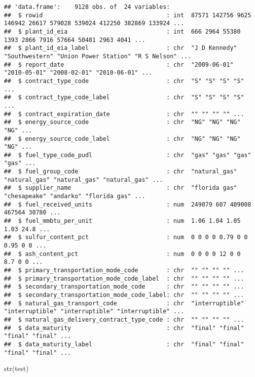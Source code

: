 \documentclass[
]{article}
\newenvironment{Shaded}{\begin{snugshade}}{\end{snugshade}}
\newcommand{\FunctionTok}[1]{\textcolor[rgb]{0.00,0.00,0.00}{#1}}
\newcommand{\NormalTok}[1]{#1}
\begin{document}
\begin{verbatim}
## 'data.frame':    9128 obs. of  24 variables:
##  $ rowid                                   : int  87571 142756 9625 146942 26617 579028 539024 412250 382869 133924 ...
##  $ plant_id_eia                            : int  666 2964 55380 1393 2866 7916 57664 50481 2963 4041 ...
##  $ plant_id_eia_label                      : chr  "J D Kennedy" "Southwestern" "Union Power Station" "R S Nelson" ...
##  $ report_date                             : chr  "2009-06-01" "2010-05-01" "2008-02-01" "2010-06-01" ...
##  $ contract_type_code                      : chr  "S" "S" "S" "S" ...
##  $ contract_type_code_label                : chr  "S" "S" "S" "S" ...
##  $ contract_expiration_date                : chr  "" "" "" "" ...
##  $ energy_source_code                      : chr  "NG" "NG" "NG" "NG" ...
##  $ energy_source_code_label                : chr  "NG" "NG" "NG" "NG" ...
##  $ fuel_type_code_pudl                     : chr  "gas" "gas" "gas" "gas" ...
##  $ fuel_group_code                         : chr  "natural_gas" "natural_gas" "natural_gas" "natural_gas" ...
##  $ supplier_name                           : chr  "florida gas" "chesapeake" "andarko" "florida gas" ...
##  $ fuel_received_units                     : num  249079 607 409008 467564 30780 ...
##  $ fuel_mmbtu_per_unit                     : num  1.06 1.04 1.05 1.03 24.8 ...
##  $ sulfur_content_pct                      : num  0 0 0 0 0.79 0 0 0.95 0 0 ...
##  $ ash_content_pct                         : num  0 0 0 0 12 0 0 8.7 0 0 ...
##  $ primary_transportation_mode_code        : chr  "" "" "" "" ...
##  $ primary_transportation_mode_code_label  : chr  "" "" "" "" ...
##  $ secondary_transportation_mode_code      : chr  "" "" "" "" ...
##  $ secondary_transportation_mode_code_label: chr  "" "" "" "" ...
##  $ natural_gas_transport_code              : chr  "interruptible" "interruptible" "interruptible" "interruptible" ...
##  $ natural_gas_delivery_contract_type_code : chr  "" "" "" "" ...
##  $ data_maturity                           : chr  "final" "final" "final" "final" ...
##  $ data_maturity_label                     : chr  "final" "final" "final" "final" ...
\end{verbatim}

\begin{Shaded}
\begin{Highlighting}[]
\FunctionTok{str}\NormalTok{(test)}
\end{Highlighting}
\end{Shaded}
\end{document}

